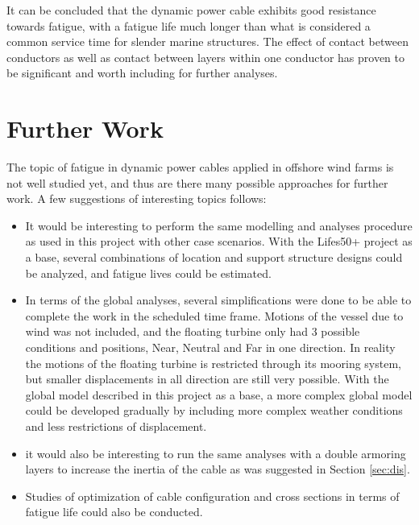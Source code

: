 It can be concluded that the dynamic power cable exhibits good resistance towards fatigue, with a fatigue life much longer than what is considered a common service time for slender marine structures. The effect of contact between conductors as well as contact between layers within one conductor has proven to be significant and worth including for further analyses. 

\section{Further Work}
The topic of fatigue in dynamic power cables applied in offshore wind farms is not well studied yet, and thus are there many possible approaches for further work. A few suggestions of interesting topics follows:
\begin{itemize}
    \item It would be interesting to perform the same modelling and analyses procedure as used in this project with other case scenarios. With the Lifes50+ project as a base, several combinations of location and support structure designs could be analyzed, and fatigue lives could be estimated. 
    \item In terms of the global analyses, several simplifications were done to be able to complete the work in the scheduled time frame. Motions of the vessel due to wind was not included, and the floating turbine only had 3 possible conditions and positions, Near, Neutral and Far in one direction. In reality the motions of the floating turbine is restricted through its mooring system, but smaller displacements in all direction are still very possible. With the global model described in this project as a base, a more complex global model could be developed gradually by including more complex weather conditions and less restrictions of displacement.
    \item it would also be interesting to run the same analyses with a double armoring layers to increase the inertia of the cable as was suggested in Section \ref{sec:dis}. 
    \item Studies of optimization of cable configuration and cross sections in terms of fatigue life could also be conducted. 
\end{itemize}

  
